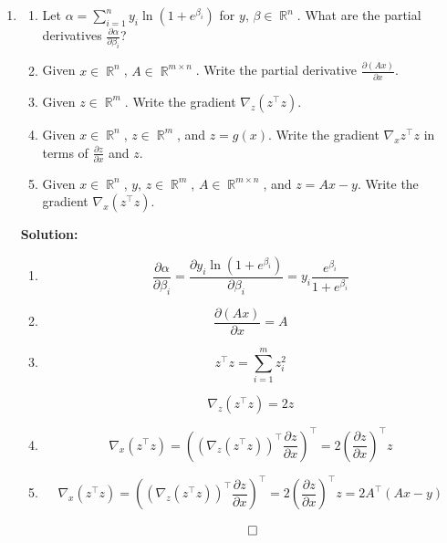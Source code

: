 \documentclass{article}
\DeclareMathOperator{\R}{\mathbb{R}}
\newenvironment{solution}{\color{blue} \smallskip \textbf{Solution:}}{}
\begin{document}
\begin{enumerate}
    \item 
    \begin{enumerate}
        \item
        Let $\alpha = \sum\limits_{i=1}^n y_i \ln{(1 + e^{\beta_i})}$ for $y,\, \beta \in \R^n$.
        What are the partial derivatives $\frac{\partial \alpha}{\partial \beta_i}$?
        \item 
        Given $x \in \R^n$, $A \in \R^{m \times n}$.
        Write the partial derivative $\frac{\partial (Ax)}{\partial x}$.
        \item
        Given $z \in \R^m$.
        Write the gradient $\nabla_z (z^\top z)$.
        \item
        Given $x \in \R^n$, $z \in \R^m$, and $z = g(x)$.
        Write the gradient $\nabla_x z^\top z$ in terms of $\frac{\partial z}{\partial x}$ and $z$.
        \item
        Given $x \in \R^n$, $y,\, z \in \R^m$, $A \in \R^{m \times n}$, and $z = Ax - y$.
        Write the gradient $\nabla_x (z^\top z)$.
    \end{enumerate}
    
    \begin{solution}
        \begin{enumerate}
            \item 
            $$
            \frac{\partial \alpha}{\partial \beta_i} = \frac{\partial y_i \ln{(1 + e^{\beta_i})}}{\partial \beta_i}=y_i\frac{e^{\beta_i}}{1+e^{\beta_i}}
            $$
            \item
            $$
            \frac{\partial (Ax)}{\partial x} = A
            $$
            \item 
            $$
            z^\top z = \sum_{i=1}^m z_i^2
            $$

            $$
            \nabla_z (z^\top z) = 2z
            $$
            \item
            $$
            \nabla_x (z^\top z) = ((\nabla_z (z^\top z))^\top\frac{\partial z}{\partial x})^\top=
            2(\frac{\partial z}{\partial x})^\top z
            $$
            \item
            $$
            \nabla_x (z^\top z) = ((\nabla_z (z^\top z))^\top\frac{\partial z}{\partial x})^\top=
            2(\frac{\partial z}{\partial x})^\top z = 2A^\top (Ax-y)
            $$
        \end{enumerate}
        \[ \qedhere \]
    \end{solution}

\end{enumerate}
\end{document}
